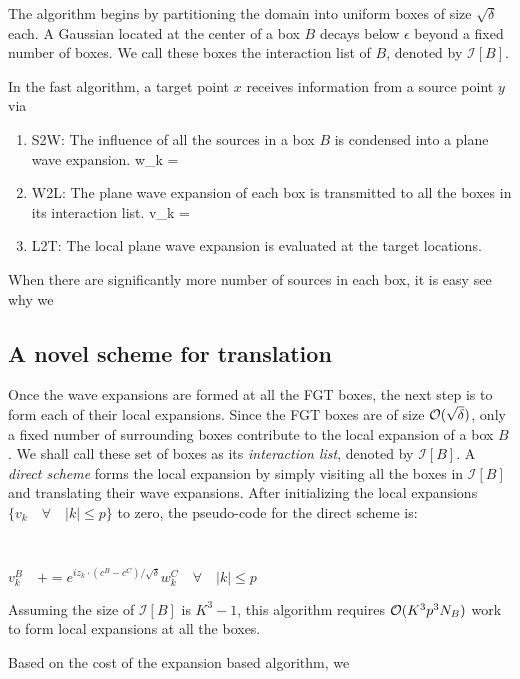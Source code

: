 \documentclass[conference]{IEEEtran}
\begin{document}
The algorithm begins by partitioning the domain into uniform boxes of size $\sqrt{\delta}$ each. A Gaussian located at the center of a box $B$ decays below $\epsilon$ beyond a fixed number of boxes. We call these boxes the interaction list of $B$, denoted by $\mathcal{I}[B]$. 

In the fast algorithm, a target point $x$ receives information from a source point $y$ via 
\begin{enumerate}
\item{S2W:} The influence of all the sources in a box $B$ is condensed into a plane wave expansion.
            \beq w_k = \eeq
\item{W2L:} The plane wave expansion of each box is transmitted to all the boxes in its interaction list. 
            \beq v_k = \eeq
\item{L2T:} The local plane wave expansion is evaluated at the target locations. 
\end{enumerate} 

When there are significantly more number of sources in each box, it is easy see why we


%

\subsection{A novel scheme for translation} 
Once the wave expansions are formed at all the FGT boxes, the next step is to form each of their local expansions. Since the FGT boxes are of size $\mathcal{O}(\sqrt{\delta})$, only a fixed number of surrounding boxes contribute to the local expansion of a box $B$. We shall call these set of boxes as its {\em interaction list}, denoted by $\mathcal{I} [B]$. A {\em direct scheme} forms the local expansion by simply visiting all the boxes in $\mathcal{I}[B]$ and translating their wave expansions. After initializing the local expansions $\{ v_k \quad \forall \quad |k| \leq p \}$ to zero, the pseudo-code for the direct scheme is:
%
{\tt
\begin{algorithmic}
           \STATE $ v_k^B \quad += e^{i z_k \cdot(c^B - c^C)/\sqrt{\delta}} w_k^C \quad \forall \quad |k| \leq p$
       \ENDFOR
\STATE
\end{algorithmic}
}
%
Assuming the size of $\mathcal{I}[B]$ is $K^3 - 1$, this algorithm requires $\mathcal{O}(K^3 p^3 N_B)$ work to form local expansions at all the boxes. 
%


Based on the cost of the expansion based algorithm, we 
\end{document}
